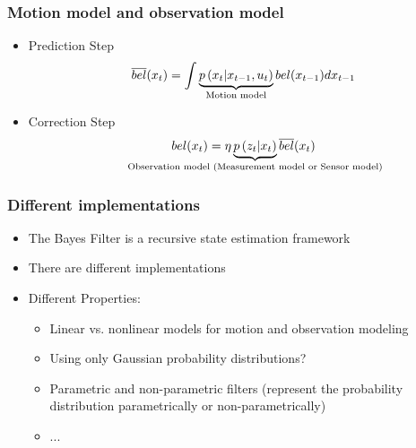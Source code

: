 \begin{frame}
    \frametitle{Motion model and observation model}
    \begin{itemize}
        \item Prediction Step
        \begin{equation*}
        \overline{bel}(x_{t}) = \int \underbrace{p\left(x_{t} | x_{t-1}, u_{t} \right)}_{\text{Motion model}} bel(x_{t-1}) d x_{t-1}
        \end{equation*}
        \item Correction Step
        \begin{equation*}
        bel(\state_{t}) = \eta \underbrace{p\left(\observation_{t} |\state_{t} \right)}_{\text{\makebox[0pt]{Observation model (Measurement model or Sensor model)}}} \overline{bel}(\state_{t})
        \end{equation*}
    \end{itemize}
    
    
\end{frame}
    
\begin{frame}
    \frametitle{Different implementations}
    \begin{itemize}
        \item The Bayes Filter is a recursive state estimation framework
        \item There are different implementations
        \item Different Properties:
        \begin{itemize}
            \item Linear vs. nonlinear models for motion and observation modeling
            \item Using only Gaussian probability distributions?
            \item Parametric and non-parametric filters (represent the probability distribution parametrically or non-parametrically)
            \item ...
        \end{itemize}
    \end{itemize}
\end{frame}
    
